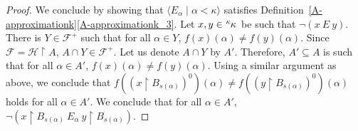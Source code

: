\documentclass[10pt,a4paper]{amsart}
\renewcommand{\k}{\kappa}
\newcommand{\pre}[2]{\tensor[^{#1}]{#2}{}}
\begin{document}
\begin{proof}
We conclude by showing that $\langle E_\alpha\mid \alpha<\kappa\rangle$ satisfies Definition~\ref{A-approximationk}\ref{A-approximationk_3}. Let $x,y\in\pre{\k}{\kappa}$ be such that $\neg(x\ E\ y)$. There is $Y\in \mathcal{F}^+$ such that for all $\alpha\in Y$, $f(x)(\alpha)\neq f(y)(\alpha)$. Since $\mathcal{F}=\mathcal{H}\restriction A$, $A\cap Y\in \mathcal{F}^+$. Let us denote $A\cap Y$ by $A'$. Therefore, $A'\subseteq A$ is such that for all $\alpha\in A'$, $f(x)(\alpha)\neq f(y)(\alpha)$. Using a similar argument as above, we conclude that $f((x\restriction B_{s(\alpha)})^0)(\alpha)\neq f((y\restriction B_{s(\alpha)})^0)(\alpha)$ holds for all $\alpha\in A'$. We conclude that for all $\alpha\in A'$, $\neg (x\restriction B_{s(\alpha)}\ E_\alpha\ y\restriction B_{s(\alpha)})$.
\end{proof}
\end{document}
